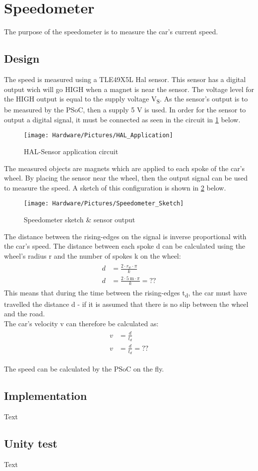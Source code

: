 \section{Speedometer}
The purpose of the speedometer is to measure the car's current speed.

\subsection{Design}
The speed is measured using a TLE49X5L Hal sensor\cite{TLE4905}. This sensor has a digital output wich will go HIGH when a magnet is near the sensor. The voltage level for the HIGH output is equal to the supply voltage V\textsubscript{S}. As the sensor's output is to be measured by the PSoC, then a supply 5 V is used.
In order for the sensor to output a digital signal, it must be connected as seen in the circuit in \ref{fig:HAL_application} below.

\begin{figure}[H]
	\centering
	\texttt{[image: Hardware/Pictures/HAL\_Application]}
	\caption{HAL-Sensor application circuit}
	\label{fig:HAL_application}
\end{figure}

The measured objects are magnets  which are applied to each spoke of the car's wheel. By placing the sensor near the wheel, then the output signal can be used to measure the speed. A sketch of this configuration is shown in \ref{fig:Speed_sketch} below.

\begin{figure}[H]
	\centering
	\texttt{[image: Hardware/Pictures/Speedometer\_Sketch]}
	\caption{Speedometer sketch \& sensor output}
	\label{fig:Speed_sketch}
\end{figure}

The distance between the rising-edges on the signal is inverse proportional with the car's speed. The distance between each spoke d can be calculated using the wheel's radius r and the number of spokes k on the wheel:
\begin{align}
	\begin{split}
		d &= \frac{2 \cdot r_w \cdot \pi}{k}\\
		d &= \frac{2 \cdot \SI{5}{\meter} \cdot \pi}{k} = ??
	\end{split}
\end{align}
This means that during the time between the rising-edges t\textsubscript{d}, the car must have travelled the distance d - if it is assumed that there is no slip between the wheel and the road.\\
The car's velocity v can therefore be calculated as:
\begin{align}
	\begin{split}
		v &= \frac{d}{t_d}\\
		v &= \frac{d}{t_d} = ??
	\end{split}
\end{align}

The speed can be calculated by the PSoC on the fly.

\subsection{Implementation}
Text

\subsection{Unity test}
Text